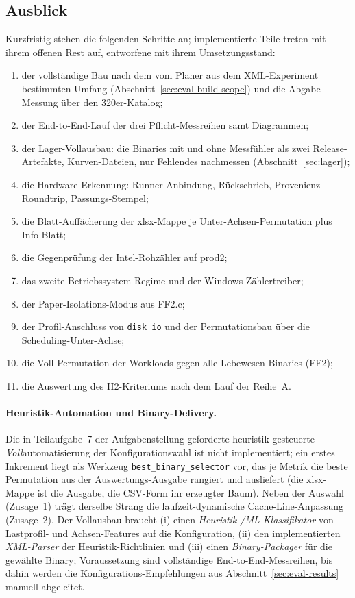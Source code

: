 \begin{nurkurz}
\section{Ausblick}\label{sec:outlook}
Kurzfristig stehen die folgenden Schritte an; implementierte Teile treten mit ihrem offenen Rest auf,
entworfene mit ihrem Umsetzungsstand:
\begin{enumerate}[label=(\arabic*)]
  \item der vollständige Bau nach dem vom Planer aus dem XML-Experiment bestimmten Umfang
  (Abschnitt~\ref{sec:eval-build-scope}) und die
  Abgabe-Messung über den 320er-Katalog;
  \item der End-to-End-Lauf der drei Pflicht-Messreihen samt Diagrammen;
  \item der Lager-Vollausbau: die Binaries mit und ohne Messfühler als zwei Release-Artefakte,
  Kurven-Dateien, nur Fehlendes nachmessen (Abschnitt~\ref{sec:lager});
  \item die Hardware-Erkennung: Runner-Anbindung, Rückschrieb, Provenienz-Roundtrip, Passungs-Stempel;
  \item die Blatt-Auffächerung der xlsx-Mappe je Unter-Achsen-Permutation plus Info-Blatt;
  \item die Gegenprüfung der Intel-Rohzähler auf prod2;
  \item das zweite Betriebssystem-Regime und der Windows-Zählertreiber;
  \item der Paper-Isolations-Modus aus FF2.c;
  \item der Profil-Anschluss von \texttt{disk\_io} und der Permutationsbau über die Scheduling-Unter-Achse;
  \item die Voll-Permutation der Workloads gegen alle Lebewesen-Binaries (FF2);
  \item die Auswertung des H2-Kriteriums nach dem Lauf der Reihe~A\@.
\end{enumerate}

\paragraph{Heuristik-Automation und Binary-Delivery.} Die in Teilaufgabe~7 der Aufgabenstellung geforderte
heuristik-gesteuerte \emph{Voll}automatisierung der Konfigurationswahl ist nicht implementiert; ein erstes
Inkrement liegt als
Werkzeug \texttt{best\_binary\_selector} vor, das je Metrik die beste Permutation aus der
Auswertungs-Ausgabe rangiert und ausliefert (die xlsx-Mappe ist die Ausgabe, die CSV-Form ihr erzeugter
Baum). Neben der Auswahl (Zusage~1) trägt derselbe Strang die laufzeit-dynamische Cache-Line-Anpassung
(Zusage~2). Der Vollausbau braucht (i) einen \emph{Heuristik-/ML-Klassifikator}
von Lastprofil- und Achsen-Features auf die Konfiguration, (ii) den implementierten \emph{XML-Parser} der
Heuristik-Richtlinien und (iii) einen \emph{Binary-Packager} für die gewählte Binary; Voraussetzung sind
vollständige End-to-End-Messreihen, bis dahin werden die Konfigurations-Empfehlungen aus
Abschnitt~\ref{sec:eval-results} manuell abgeleitet.


\end{nurkurz}
